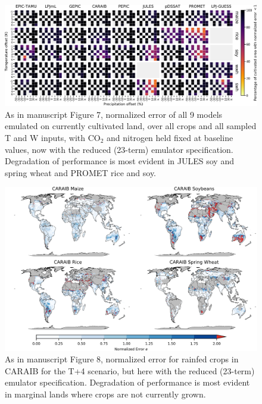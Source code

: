 \documentclass[12pt]{article}
\begin{document}
\begin{figure}[h!]
  \centering
  \includegraphics[width=15.5cm]{reduced_error_grid.png}
  \caption{
  As in manuscript Figure 7, normalized error of all 9 models emulated on currently cultivated land, over all crops and all sampled T and W inputs, with CO$_2$ and nitrogen held fixed at baseline values, now with the reduced (23-term) emulator specification. Degradation of performance is most evident in JULES soy and spring wheat and PROMET rice and soy.
  }
  \label{fig:reducedgrid}
\end{figure}

\begin{figure}[h!]
  \centering
  \includegraphics[width=15.5cm]{reduced_CARAIB_spatial_error.png}
  \caption{
  As in manuscript Figure 8, normalized error for rainfed crops in CARAIB for the T+4 scenario, but here with the reduced (23-term) emulator specification. Degradation of performance is most evident in marginal lands where crops are not currently grown.
  }
  \label{fig:reducedcaraib}
\end{figure}
\end{document}
